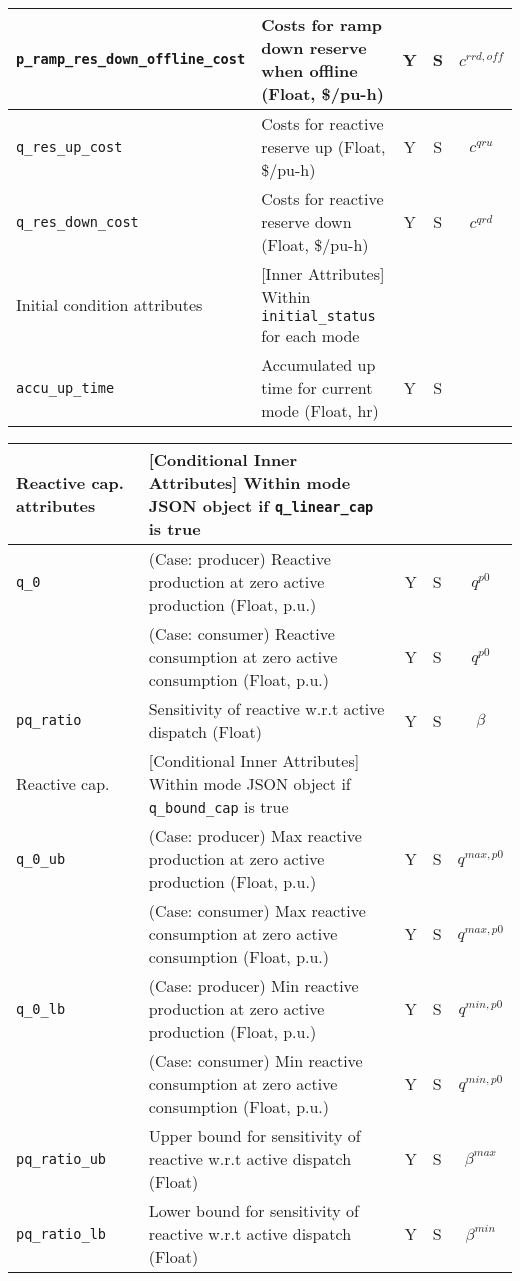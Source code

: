 \documentclass{article}
\begin{document}
\begin{center}
\begin{tabular}{ l | l | c | c | c |}
  {\tt p\_ramp\_res\_down\_offline\_cost}  & Costs for ramp down reserve when offline (Float, \$/pu-h) & Y & S & $c^{rrd, off}$\\
  \hline
  {\tt q\_res\_up\_cost} & Costs for reactive reserve up (Float, \$/pu-h) & Y & S & $c^{qru}$\\
  {\tt q\_res\_down\_cost} & Costs for reactive reserve down (Float, \$/pu-h) & Y & S & $c^{qrd}$\\
   \hline
  \hline
  Initial condition attributes & [Inner Attributes] Within {\tt initial\_status} for each mode &  &  & \\
  \hline
  {\tt accu\_up\_time} & Accumulated up time for current mode (Float, hr) & Y & S & \\
  \hline

\end{tabular}
\end{center}

\begin{center}
\small
\begin{tabular}{ l | l | c | c | c |}
 \hline
  Reactive cap. attributes & [Conditional Inner Attributes] Within mode JSON object if {\tt q\_linear\_cap} is true &  &  & \\
  \hline
  {\tt q\_0}               & { (Case: producer) Reactive production at zero active production (Float, p.u.) }& Y & S & $q^{p0}$\\
                           & { (Case: consumer) Reactive consumption at zero active consumption (Float, p.u.) }& Y & S & $q^{p0}$\\
  {\tt pq\_ratio}          & Sensitivity of reactive w.r.t active dispatch (Float) & Y & S & $\beta$\\
  \hline \hline
  Reactive cap. & [Conditional Inner Attributes] Within mode JSON object if {\tt q\_bound\_cap} is true &  &  & \\
  \hline
  {\tt q\_0\_ub}           & { (Case: producer) Max reactive production at zero active production (Float, p.u.)} & Y & S & $q^{max,p0}$\\
                           & { (Case: consumer) Max reactive consumption at zero active consumption (Float, p.u.)} & Y & S & $q^{max,p0}$\\
  {\tt q\_0\_lb}           & { (Case: producer) Min reactive production at zero active production (Float, p.u.)} & Y & S & $q^{min,p0}$\\
                           & { (Case: consumer) Min reactive consumption at zero active consumption (Float, p.u.)} & Y & S & $q^{min,p0}$\\
  {\tt pq\_ratio\_ub}      & Upper bound for sensitivity of reactive w.r.t active dispatch (Float) & Y & S & $\beta^{max}$\\
  {\tt pq\_ratio\_lb}      & Lower bound for sensitivity of reactive w.r.t active dispatch (Float) & Y & S & $\beta^{min}$\\
  \hline
\end{tabular}
\end{center}
\end{document}
